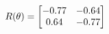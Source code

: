 \documentclass[preview]{standalone}
\begin{document}
\begin{align*}
\special{dvisvgm:raw <g id='unique000'>}R(\theta) = \begin{bmatrix}-0.77 & -0.64\\0.64 & -0.77\end{bmatrix}\special{dvisvgm:raw </g>}
\end{align*}
\end{document}
